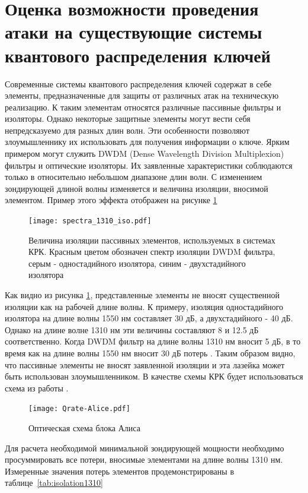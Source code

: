 \section{Оценка возможности проведения атаки на существующие системы квантового распределения ключей}\label{sec:ch4/sect6}
Современные системы квантового распределения ключей содержат в себе элементы, предназначенные для защиты от различных атак на техническую реализацию. К таким элементам относятся различные пассивные фильтры и изоляторы.
Однако некоторые защитные элементы могут вести себя непредсказуемо для разных длин волн. Эти особенности позволяют злоумышленнику их использовать для получения информации о ключе.
Ярким примером могут служить DWDM (Dense Wavelength Division Multiplexion) фильтры и оптические изоляторы. Их заявленные характеристики соблюдаются только в относительно небольшом диапазоне длин волн.
С изменением зондирующей длиной волны изменяется и величина изоляции, вносимой элементом. Пример этого эффекта отображен на рисунке \ref{fig:isolation_spectrums}
\begin{figure}
    \centering
    \texttt{[image: spectra\_1310\_iso.pdf]}
    \caption{Величина изоляции пассивных элементов, используемых в системах КРК. Красным цветом обозначен спектр изоляции DWDM фильтра, серым - одностадийного изолятора, синим - двухстадийного изолятора}
    \label{fig:isolation_spectrums}
\end{figure}
Как видно из рисунка \ref{fig:isolation_spectrums}, представленные элементы не вносят существенной изоляции как на рабочей длине волны. К примеру, изоляция одностадийного изолятора на длине волны 1550 нм составляет 30 дБ, а двухстадийного - 40 дБ. Однако на длине волне 1310 нм эти величины составляют 8 и 12.5 дБ соответственно.
Когда DWDM фильтр на длине волны 1310 нм вносит 5 дБ, в то время как на длине волны 1550 нм вносит 30 дБ потерь \cite{ponosova2022}. Таким образом видно, что пассивные элементы не вносят заявленной изоляции и эта лазейка может быть использован злоумышленником.
В качестве схемы КРК будет использоваться схема из работы \cite{makarov2023}. 
\begin{figure}
    \centering
    \texttt{[image: Qrate-Alice.pdf]}
    \caption{Оптическая схема блока Алиса}\label{fig:Alice_qrate}
\end{figure}
Для расчета необходимой минимальной зондирующей мощности необходимо просуммировать все потери, вносимые элементами на длине волны 1310 нм. 
Измеренные значения потерь элементов продемонстрированы в таблице~\ref{tab:isolation1310}
